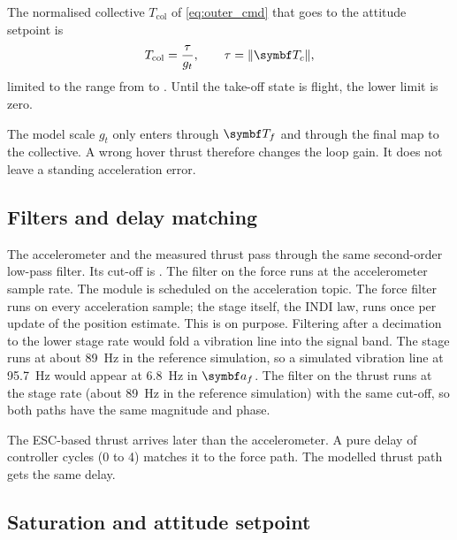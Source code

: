 The normalised collective $T_{\mathrm{col}}$ of \cref{eq:outer_cmd} that goes to the attitude setpoint is
\begin{equation}\label{eq:outer_cmd}
  T_{\mathrm{col}} = \frac{\tau}{g_t}, \qquad \tau = \lVert\vect T_c\rVert ,
\end{equation}
limited to the range from  to .
Until the take-off state is flight, the lower limit is zero.

\begin{keyresult}
The model scale $g_t$ only enters through $\vect T_f$ and through the final map to the collective.
A wrong hover thrust therefore changes the loop gain.
It does not leave a standing acceleration error.
\end{keyresult}

\subsection{Filters and delay matching}\label{sec:outer_filters}

The accelerometer and the measured thrust pass through the same second-order low-pass filter.
Its cut-off is .
The filter on the force runs at the accelerometer sample rate.
The module is scheduled on the acceleration topic.
The force filter runs on every acceleration sample; the stage itself, the INDI law, runs once per update of the position estimate.
This is on purpose.
Filtering after a decimation to the lower stage rate would fold a vibration line into the signal band.
The stage runs at about 89~Hz in the reference simulation, so a simulated vibration line at 95.7~Hz would appear at 6.8~Hz in $\vect a_f$.
The filter on the thrust runs at the stage rate (about 89~Hz in the reference simulation) with the same cut-off, so both paths have the same magnitude and phase.

The ESC-based thrust arrives later than the accelerometer.
A pure delay of  controller cycles (0 to 4) matches it to the force path.
The modelled thrust path gets the same delay.

\subsection{Saturation and attitude setpoint}\label{sec:outer_sat}

